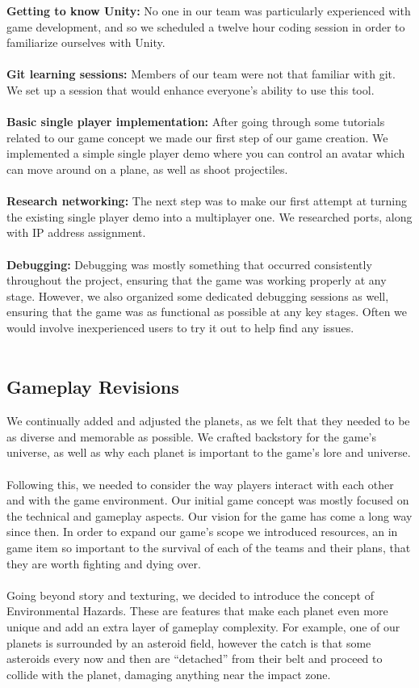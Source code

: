 \documentclass[11pt,a4paper]{article}
\begin{document}
\noindent
        \textbf{Getting to know Unity:} No one in our team was particularly experienced with game development, and so we scheduled a twelve hour coding session in order to familiarize ourselves with Unity.\\\\
\noindent
        \textbf{Git learning sessions:} Members of our team  were not that familiar with git. We set up a session that would enhance everyone’s ability to use this tool.\\\\
        \noindent
        \textbf{Basic single player implementation:} After going through some tutorials related to our game concept we made our first step of our game creation. We implemented a simple single player demo where you can control an avatar which can move around on a plane, as well as shoot projectiles. \\ \\
\noindent
        \textbf{Research networking:} The next step was to make our first attempt at turning the existing single player demo into a multiplayer one. We researched ports, along with IP address assignment. \\ \\
        \noindent
        \textbf{Debugging:} Debugging was mostly something that occurred consistently throughout the project, ensuring that the game was working properly at any stage. However, we also organized some dedicated debugging sessions as well, ensuring that the game was as functional as possible at any key stages. Often we would involve inexperienced users to try it out to help find any issues. \\ \\

        \subsection{Gameplay Revisions}
        We continually added and adjusted the planets, as we felt that they needed to be as diverse and memorable as possible. We crafted backstory for the game's universe, as well as why each planet is important to the game's lore and universe. \\ \\ 
        Following this, we needed to consider the way players interact with each other and with the game environment. Our initial game concept was mostly focused on the technical and gameplay aspects. Our vision for the game has come a long way since then. In order to expand our game's scope we introduced resources, an in game item so important to the survival of each of the teams and their plans, that they are worth fighting and dying over. \\ \\
        Going beyond story and texturing, we decided to introduce the concept of Environmental Hazards. These are features that make each planet even more unique and add an extra layer of gameplay complexity. For example, one of our planets is surrounded by an asteroid field, however the catch is that some asteroids every now and then are “detached” from their belt and proceed to collide with the planet, damaging anything near the impact zone.
\end{document}
